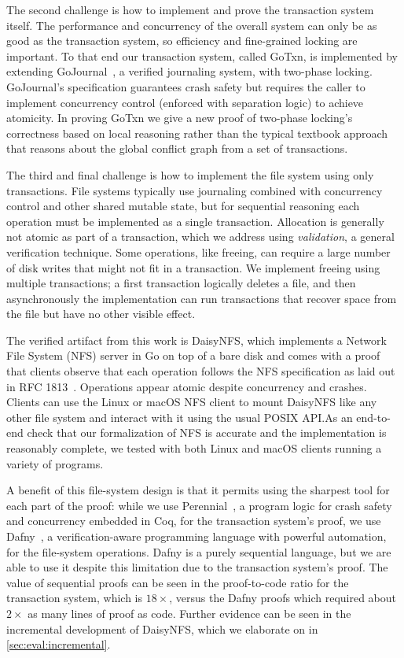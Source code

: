 The second challenge is how to implement and prove the transaction system
itself. The performance and concurrency of the overall system can only be as
good as the transaction system, so efficiency and fine-grained locking are
important. To that end our transaction system, called GoTxn, is implemented by
extending GoJournal~\cite{chajed:gojournal}, a verified journaling system, with
two-phase locking. GoJournal's specification guarantees crash safety but
requires the caller to implement concurrency control (enforced with separation logic) to achieve atomicity.
In proving GoTxn we give a new proof of two-phase
locking's correctness based on local reasoning rather than
the typical textbook approach that reasons about the global conflict graph from
a set of transactions.

The third and final challenge is how to implement the file system using only
transactions. File systems typically use journaling combined with concurrency
control and other shared mutable state, but for sequential reasoning each
operation must be implemented as a single transaction. Allocation is generally
not atomic as part of a transaction, which we address using \emph{validation}, a
general verification technique.
Some operations, like freeing, can require a large
number of disk writes that might not fit in a transaction. We implement freeing
using multiple transactions; a first transaction logically deletes a file, and
then asynchronously the implementation can run transactions that recover space
from the file but have no other visible effect.

The verified artifact from this work is DaisyNFS, which implements a
Network File System (NFS) server in Go on top of a bare disk and comes
with a proof that clients observe that each operation follows the NFS
specification as laid out in RFC 1813~\cite{RFC:1813}. Operations appear atomic
despite concurrency and crashes. Clients can use the Linux or macOS
NFS client to mount DaisyNFS like any other file system and interact with
it using the usual POSIX API.\@  As an end-to-end check that our
formalization of NFS is accurate and the implementation is reasonably
complete, we tested with both Linux and macOS clients running a
variety of programs.

A benefit of this file-system design is that it permits using the
sharpest tool for each part of the proof: while we use
Perennial~\cite{chajed:gojournal}, a program logic for crash safety
and concurrency embedded in Coq, for the
transaction system's proof, we use Dafny~\cite{leino:dafny}, a verification-aware
programming language with powerful automation, for the file-system operations.
Dafny is a purely sequential language, but we are able to use it despite this
limitation due to the transaction system's proof. The value of
sequential proofs can be seen in the proof-to-code ratio for the transaction
system, which is $18\times$, versus the Dafny proofs which required about
$2\times$ as many lines of proof as code. Further evidence can be seen in the
incremental development of DaisyNFS, which we elaborate on in
\cref{sec:eval:incremental}.

